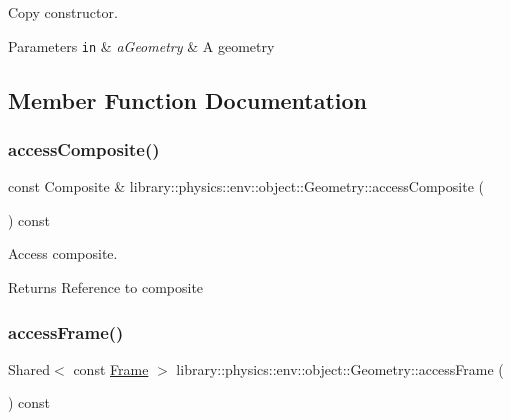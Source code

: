 Copy constructor. 


\begin{DoxyParams}[1]{Parameters}
\mbox{\tt in}  & {\em a\+Geometry} & A geometry \\
\hline
\end{DoxyParams}


\subsection{Member Function Documentation}
\mbox{\label{classlibrary_1_1physics_1_1env_1_1object_1_1_geometry_ac107f01b791d7844e434c553643dcdf3}} 
\subsubsection{\texorpdfstring{access\+Composite()}{accessComposite()}}
{\footnotesize\ttfamily const Composite \& library\+::physics\+::env\+::object\+::\+Geometry\+::access\+Composite (\begin{DoxyParamCaption}{ }\end{DoxyParamCaption}) const}



Access composite. 

\begin{DoxyReturn}{Returns}
Reference to composite 
\end{DoxyReturn}
\mbox{\label{classlibrary_1_1physics_1_1env_1_1object_1_1_geometry_a1a0569b5cdfba033d355057e215e22b8}} 
\subsubsection{\texorpdfstring{access\+Frame()}{accessFrame()}}
{\footnotesize\ttfamily Shared$<$ const \hyperlink{classlibrary_1_1physics_1_1coord_1_1_frame}{Frame} $>$ library\+::physics\+::env\+::object\+::\+Geometry\+::access\+Frame (\begin{DoxyParamCaption}{ }\end{DoxyParamCaption}) const}



